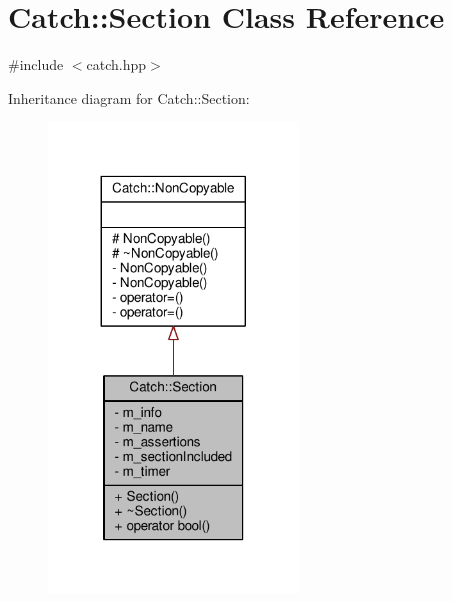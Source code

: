 \hypertarget{class_catch_1_1_section}{\section{Catch\-:\-:Section Class Reference}
\label{class_catch_1_1_section}
}


{\ttfamily \#include $<$catch.\-hpp$>$}



Inheritance diagram for Catch\-:\-:Section\-:
\nopagebreak
\begin{figure}[H]
\begin{center}
\leavevmode
\includegraphics[width=188pt]{class_catch_1_1_section__inherit__graph}
\end{center}
\end{figure}


